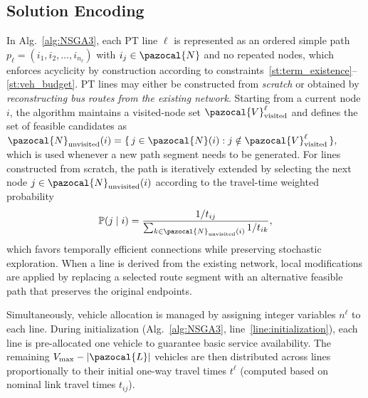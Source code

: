 \documentclass[a4paper,fleqn]{cas-sc}
\begin{document}
\subsection{Solution Encoding}\label{sec:encoding}

In Alg.~\ref{alg:NSGA3}, each PT line $\ell$ is represented as an ordered simple path
$p_\ell = (i_1, i_2, \dots, i_{n_\ell})$ with $i_j \in \pazocal{N}$ and no repeated nodes, which enforces acyclicity by construction according to constraints~\eqref{st:term_existence}--\eqref{st:veh_budget}.
PT lines may either be constructed from \textit{scratch} or obtained by \textit{reconstructing bus routes from the existing network}.
Starting from a current node $i$, the algorithm maintains a visited-node set $\pazocal{V}_{\text{visited}}^\ell$ and defines the set of feasible candidates as
$
\pazocal{N}_{\text{unvisited}}(i)
=
\{\, j \in \pazocal{N}(i) : j \notin \pazocal{V}_{\text{visited}}^\ell \,\},
$
which is used whenever a new path segment needs to be generated.
For lines constructed from scratch, the path is iteratively extended by selecting the next node $j \in \pazocal{N}_{\text{unvisited}}(i)$ according to the travel-time weighted probability
\begin{equation}
\label{eq:node-addition-probability}
\mathbb{P}(j \mid i)
=
\frac{1/t_{ij}}{\sum_{k\in\pazocal{N}_{\text{unvisited}}(i)} 1/t_{ik}},
\end{equation}
which favors temporally efficient connections while preserving stochastic exploration.
%
When a line is derived from the existing network, local modifications are applied by replacing a selected route segment with an alternative feasible path that preserves the original endpoints.

Simultaneously, vehicle allocation is managed by assigning integer variables $n^\ell$ to each line. 
%
During initialization (Alg.~\ref{alg:NSGA3}, line~\ref{line:initialization}),
each line is pre-allocated one vehicle to guarantee basic service availability.
The remaining $V_{\max}-|\pazocal{L}|$ vehicles are then distributed across
lines proportionally to their initial one-way travel times $t^\ell$ (computed based on nominal link travel times $t_{ij}$).
\end{document}
